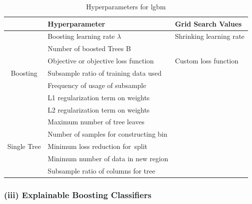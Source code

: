 \documentclass[12pt,titlepage]{article}
\begin{document}
\begin{table} \label{hp_lgbm}
    \centering
    \caption{Hyperparameters for lgbm}
    \begin{tabular}{c|l|l|}
    \hline
    \multicolumn{1}{l|}{}                                       & Hyperparameter                            & Grid Search Values       \\
    \hline
    \multirow{7}{*}{\begin{sideways} Boosting \end{sideways}}                         & Boosting learning rate $\lambda$                                                                & Shrinking learning rate  \\
    & Number of boosted Trees B              &                          \\
    & Objective or objective loss function   & Custom loss function     \\
    & Subsample ratio of training data used  &                          \\
    & Frequency of usage of subsample        &                          \\
    & L1 regularization term on weights      &                          \\
    & L2 regularization term on weights      &                          \\
    \hline
    \multicolumn{1}{l|}{\multirow{5}{*}{\begin{sideways} Single Tree \end{sideways}}} & Maximum number of tree leaves          &                          \\
    \multicolumn{1}{l|}{}                                       & Number of samples for constructing bin &                          \\
    \multicolumn{1}{l|}{}                                       & Minimum loss reduction for~split       &                          \\
    \multicolumn{1}{l|}{}                                       & Minimum number of data in new region   &                          \\
    \multicolumn{1}{l|}{}                                              & Subsample ratio of columns for tree    &                          \\
    \hline
    \end{tabular}
\end{table}

\subsubsection*{(iii) Explainable Boosting Classifiers}
\end{document}

